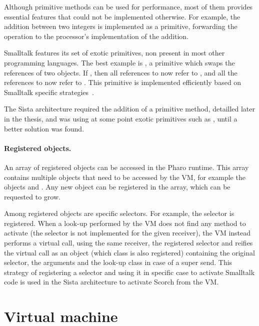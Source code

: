 \documentclass[a4paper,12pt,twoside]{../includes/ThesisStyle}
\begin{document}
Although primitive methods can be used for performance, most of them provides essential features that could not be implemented otherwise. For example, the addition between two integers is implemented as a primitive, forwarding the operation to the processor's implementation of the addition.

Smalltalk features its set of exotic primitives, non present in most other programming languages. The best example is , a primitive which swaps the references of two objects. If , then all references to  now refer to , and all the references to  now refer to . This primitive is implemented efficiently based on Smalltalk specific strategies~\cite{Mir15a}.

The Sista architecture required the addition of a primitive method, detailled later in the thesis, and was using at some point exotic primitives such as , until a better solution was found.

\paragraph{Registered objects.} An array of registered objects can be accessed in the Pharo runtime. This array contains multiple objects that need to be accessed by the VM, for example the objects  and . Any new object can be registered in the array, which can be requested to grow. 

Among registered objects are specific selectors. For example, the  selector is registered. When a look-up performed by the VM does not find any method to activate (the selector is not implemented for the given receiver), the VM instead performs a virtual call, using the same receiver, the registered  selector and reifies the virtual call as an object (which class is also registered) containing the original selector, the arguments and the look-up class in case of a super send. This strategy of registering a selector and using it in specific case to activate Smalltalk code is used in the Sista architecture to activate Scorch from the VM.


\section{Virtual machine}
\end{document}
